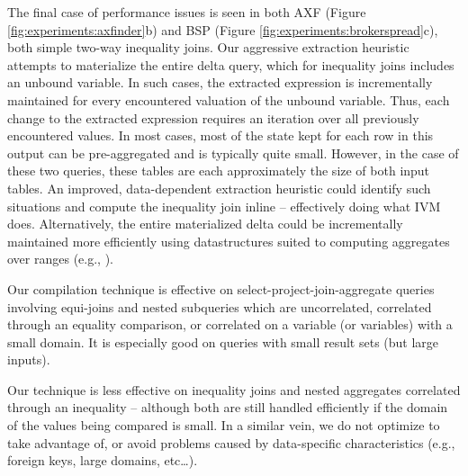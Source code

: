The final case of performance issues is seen in both AXF (Figure \ref{fig:experiments:axfinder}b) and BSP (Figure \ref{fig:experiments:brokerspread}c), both simple two-way inequality joins.  Our aggressive extraction heuristic attempts to materialize the entire delta query, which for inequality joins includes an unbound variable.  In such cases, the extracted expression is incrementally maintained for every encountered valuation of the unbound variable.  Thus, each change to the extracted expression requires an iteration over all previously encountered values.  In most cases, most of the state kept for each row in this output can be pre-aggregated and is typically quite small.  However, in the case of these two queries, these tables are each approximately the size of both input tables.  An improved, data-dependent extraction heuristic could identify such situations and compute the inequality join inline -- effectively doing what IVM does.  Alternatively, the entire materialized delta could be incrementally maintained more efficiently using datastructures suited to computing aggregates over ranges (e.g., \cite{range trees}).

Our compilation technique is effective on select-project-join-aggregate queries involving equi-joins and nested subqueries which are uncorrelated, correlated through an equality comparison, or correlated on a variable (or variables) with a small domain.  It is especially good on queries with small result sets (but large inputs).

Our technique is less effective on inequality joins and nested aggregates correlated through an inequality -- although both are still handled efficiently if the domain of the values being compared is small.  In a similar vein, we do not optimize to take advantage of, or avoid problems caused by data-specific characteristics (e.g., foreign keys, large domains, etc\ldots). 



\begin{figure}
\begin{center}
\end{center}
\end{figure}



